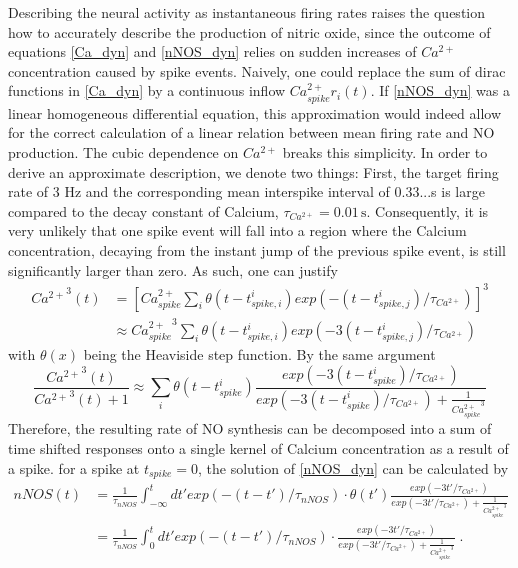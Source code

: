 \documentclass[10pt,a4paper]{article}
\begin{document}
Describing the neural activity as instantaneous firing rates raises the question how to accurately describe the production of nitric oxide, since the outcome of equations \eqref{Ca_dyn} and \eqref{nNOS_dyn} relies on sudden increases of $Ca^{2+}$ concentration caused by spike events. Naively, one could replace the sum of dirac functions in \eqref{Ca_dyn} by a continuous inflow $Ca^{2+}_{spike} r_i(t)$. If \eqref{nNOS_dyn} was a linear homogeneous differential equation, this approximation would indeed allow for the correct calculation of a linear relation between mean firing rate and NO production. The cubic dependence on $Ca^{2+}$ breaks this simplicity. In order to derive an approximate description, we denote two things: First, the target firing rate of 3 Hz and the corresponding mean interspike interval of 0.33...s is large compared to the decay constant of Calcium, $\tau_{Ca^{2+}} = \mathrm{0.01\,s}$. Consequently, it is very unlikely that one spike event will fall into a region where the Calcium concentration, decaying from the instant jump of the previous spike event, is still significantly larger than zero. As such, one can justify
\begin{equation}
\begin{split}
{Ca^{2+}}^3(t) &= \left[ Ca^{2+}_{spike} \sum_{i} \theta(t-t^i_{spike,i}) exp(-(t-t^i_{spike,j})/\tau_{Ca^{2+}}) \right]^3 \\
&\approx {Ca^{2+}_{spike}}^3 \sum_{i} \theta(t-t^i_{spike,i}) exp(-3(t-t^i_{spike,j})/\tau_{Ca^{2+}})
\end{split} \label{cubic_approx_1}			
\end{equation}
with $\theta(x)$ being the Heaviside step function. By the same argument
\begin{equation}
\frac{{Ca^{2+}}^3(t)}{{Ca^{2+}}^3(t)+1} \approx \sum_{i} \theta(t-t^i_{spike}) \frac{exp(-3(t-t^i_{spike})/\tau_{Ca^{2+}})}{exp(-3(t-t^i_{spike})/\tau_{Ca^{2+}}) + \frac{1}{{Ca^{2+}_{spike}}^3}}  
\end{equation}
Therefore, the resulting rate of NO synthesis can be decomposed into a sum of time shifted responses onto a single kernel of Calcium concentration as a result of a spike. for a spike at $t_{spike}=0$, the solution of \eqref{nNOS_dyn} can be calculated by
\begin{equation}
\begin{split}
nNOS(t) &= \frac{1}{\tau_{nNOS}}\int_{-\infty}^t dt' exp(-(t-t')/\tau_{nNOS})\cdot \theta(t') \frac{exp(-3t'/\tau_{Ca^{2+}})}{exp(-3t'/\tau_{Ca^{2+}}) + \frac{1}{{Ca^{2+}_{spike}}^3}} \\
&= \frac{1}{\tau_{nNOS}}\int_{0}^t dt' exp(-(t-t')/\tau_{nNOS})\cdot \frac{exp(-3t'/\tau_{Ca^{2+}})}{exp(-3t'/\tau_{Ca^{2+}}) + \frac{1}{{Ca^{2+}_{spike}}^3}}\;.
\end{split}\label{nNOS_single_sol}
\end{equation}
\end{document}
